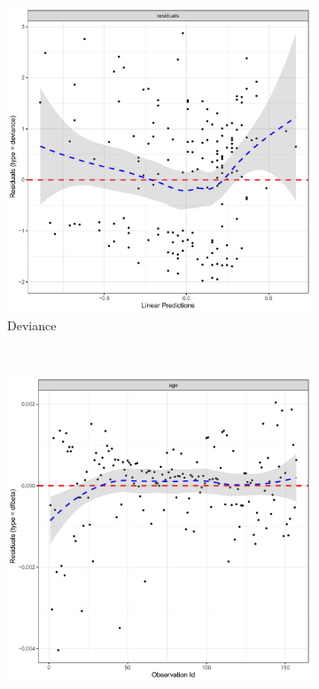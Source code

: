 \begin{figure}[H]
\centering
  \begin{subfigure}[c]{0.48\textwidth}\centering
  \includegraphics[width=\textwidth]{figures/survival/stanford_cox_age_deviance_residuals}
  \caption{Deviance}
  \label{fig:cox:outliers:deviance}
  \end{subfigure}
  ~
  \begin{subfigure}[c]{0.48\textwidth}\centering
  \includegraphics[width=\textwidth]{figures/survival/stanford_cox_age_dfbeta}

\end{subfigure}
\end{figure}
